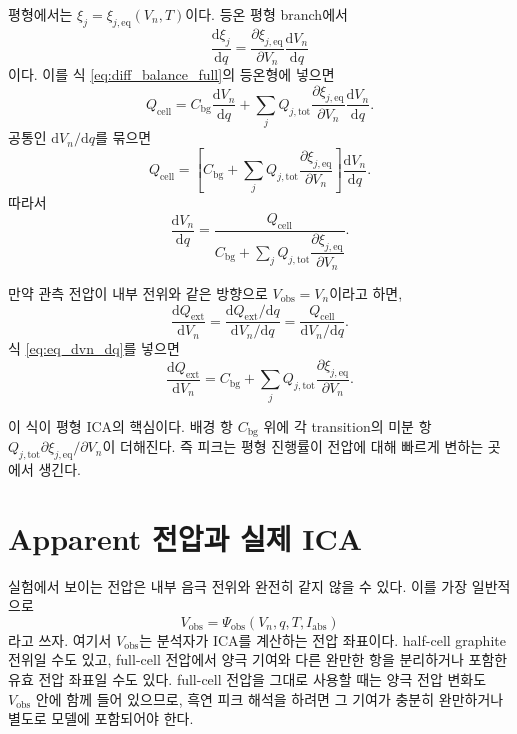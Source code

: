 \documentclass[11pt,a4paper]{article}
\newcommand{\dd}{\mathrm{d}}
\newcommand{\ext}{\mathrm{ext}}
\newcommand{\cell}{\mathrm{cell}}
\newcommand{\bg}{\mathrm{bg}}
\newcommand{\tot}{\mathrm{tot}}
\newcommand{\eqs}{\mathrm{eq}}
\newcommand{\obs}{\mathrm{obs}}
\newcommand{\absI}{I_{\mathrm{abs}}}
\begin{document}
평형에서는 \(\xi_j=\xi_{j,\eqs}(V_n,T)\)이다. 등온 평형 branch에서
\begin{equation}
\frac{\dd \xi_j}{\dd q}
=
\frac{\partial \xi_{j,\eqs}}{\partial V_n}
\frac{\dd V_n}{\dd q}
\label{eq:xi_eq_chain}
\end{equation}
이다. 이를 식 \eqref{eq:diff_balance_full}의 등온형에 넣으면
\begin{equation}
Q_{\cell}
=
C_{\bg}\frac{\dd V_n}{\dd q}
+
\sum_jQ_{j,\tot}
\frac{\partial \xi_{j,\eqs}}{\partial V_n}
\frac{\dd V_n}{\dd q}.
\label{eq:eq_diff_inserted}
\end{equation}
공통인 \(\dd V_n/\dd q\)를 묶으면
\begin{equation}
Q_{\cell}
=
\left[
C_{\bg}
+
\sum_jQ_{j,\tot}
\frac{\partial \xi_{j,\eqs}}{\partial V_n}
\right]
\frac{\dd V_n}{\dd q}.
\label{eq:eq_diff_grouped}
\end{equation}
따라서
\begin{equation}
\frac{\dd V_n}{\dd q}
=
\frac{Q_{\cell}}{
C_{\bg}
+
\sum_jQ_{j,\tot}
\dfrac{\partial \xi_{j,\eqs}}{\partial V_n}
}.
\label{eq:eq_dvn_dq}
\end{equation}

만약 관측 전압이 내부 전위와 같은 방향으로 \(V_{\obs}=V_n\)이라고 하면,
\begin{equation}
\frac{\dd Q_{\ext}}{\dd V_n}
=
\frac{\dd Q_{\ext}/\dd q}{\dd V_n/\dd q}
=
\frac{Q_{\cell}}{\dd V_n/\dd q}.
\label{eq:ica_from_reciprocal}
\end{equation}
식 \eqref{eq:eq_dvn_dq}를 넣으면
\begin{equation}
\boxed{
\frac{\dd Q_{\ext}}{\dd V_n}
=
C_{\bg}
+
\sum_jQ_{j,\tot}
\frac{\partial \xi_{j,\eqs}}{\partial V_n}.
}
\label{eq:eq_ica_decomposition}
\end{equation}

이 식이 평형 ICA의 핵심이다. 배경 항 \(C_{\bg}\) 위에 각 transition의 미분 항 \(Q_{j,\tot}\partial \xi_{j,\eqs}/\partial V_n\)이 더해진다. 즉 피크는 평형 진행률이 전압에 대해 빠르게 변하는 곳에서 생긴다.

\section{Apparent 전압과 실제 ICA}

실험에서 보이는 전압은 내부 음극 전위와 완전히 같지 않을 수 있다. 이를 가장 일반적으로
\begin{equation}
V_{\obs}
=
\Psi_{\obs}(V_n,q,T,\absI)
\label{eq:vobs_map}
\end{equation}
라고 쓰자. 여기서 \(V_{\obs}\)는 분석자가 ICA를 계산하는 전압 좌표이다. half-cell graphite 전위일 수도 있고, full-cell 전압에서 양극 기여와 다른 완만한 항을 분리하거나 포함한 유효 전압 좌표일 수도 있다. full-cell 전압을 그대로 사용할 때는 양극 전압 변화도 \(V_{\obs}\) 안에 함께 들어 있으므로, 흑연 피크 해석을 하려면 그 기여가 충분히 완만하거나 별도로 모델에 포함되어야 한다.
\end{document}
